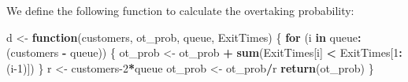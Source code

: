 \documentclass[]{article}
\newenvironment{Shaded}{\begin{snugshade}}{\end{snugshade}}
\newcommand{\ControlFlowTok}[1]{\textcolor[rgb]{0.13,0.29,0.53}{\textbf{#1}}}
\newcommand{\DecValTok}[1]{\textcolor[rgb]{0.00,0.00,0.81}{#1}}
\newcommand{\KeywordTok}[1]{\textcolor[rgb]{0.13,0.29,0.53}{\textbf{#1}}}
\newcommand{\NormalTok}[1]{#1}
\newcommand{\OperatorTok}[1]{\textcolor[rgb]{0.81,0.36,0.00}{\textbf{#1}}}
\newcommand{\StringTok}[1]{\textcolor[rgb]{0.31,0.60,0.02}{#1}}
\begin{document}
We define the following function to calculate the overtaking
probability:

\begin{Shaded}
\begin{Highlighting}[]
\NormalTok{d <-}\StringTok{ }\ControlFlowTok{function}\NormalTok{(customers, ot_prob, queue, ExitTimes) \{}
    \ControlFlowTok{for}\NormalTok{ (i }\ControlFlowTok{in}\NormalTok{ queue}\OperatorTok{:}\NormalTok{(customers }\OperatorTok{-}\StringTok{ }\NormalTok{queue)) \{}
\NormalTok{        ot_prob <-}\StringTok{ }\NormalTok{ot_prob }\OperatorTok{+}\StringTok{ }\KeywordTok{sum}\NormalTok{(ExitTimes[i] }\OperatorTok{<}\StringTok{ }\NormalTok{ExitTimes[}\DecValTok{1}\OperatorTok{:}\NormalTok{(i}\DecValTok{-1}\NormalTok{)])}
\NormalTok{    \}}
\NormalTok{    r <-}\StringTok{ }\NormalTok{customers}\DecValTok{-2}\OperatorTok{*}\NormalTok{queue}
\NormalTok{    ot_prob <-}\StringTok{ }\NormalTok{ot_prob}\OperatorTok{/}\NormalTok{r}
    \KeywordTok{return}\NormalTok{(ot_prob)}
\NormalTok{\}}
\end{Highlighting}
\end{Shaded}
\end{document}
